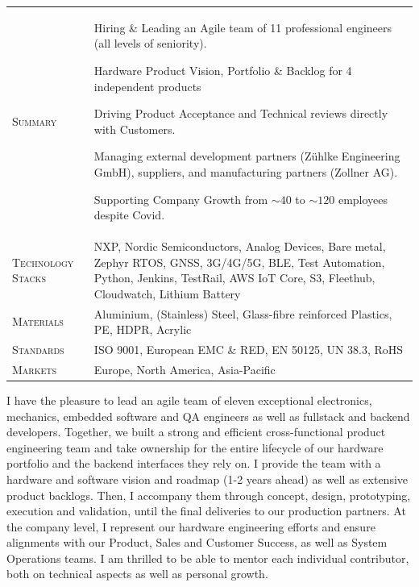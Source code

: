 \documentclass[10pt,a4paper]{moderncv}
\begin{document}
    \begin{tabularx}{\textwidth}{>{\scshape}l@{\hskip 3.5mm}L}
        Summary & Hiring \& Leading an Agile team of 11 professional engineers (all levels of seniority).
        \par Hardware Product Vision, Portfolio \& Backlog for 4 independent products
        \par Driving Product Acceptance and Technical reviews directly with Customers.
        \par Managing external development partners (Zühlke Engineering GmbH), suppliers, and manufacturing partners (Zollner AG).
        \par Supporting Company Growth from $\sim 40$ to $\sim 120$ employees despite Covid.\\
        Technology Stacks & NXP, Nordic Semiconductors, Analog Devices, Bare metal, Zephyr RTOS, GNSS, 3G/4G/5G, BLE, Test Automation, Python, Jenkins, TestRail, AWS IoT Core, S3, Fleethub, Cloudwatch, Lithium Battery\\
        Materials &  Aluminium, (Stainless) Steel, Glass-fibre reinforced Plastics, PE, HDPR, Acrylic\\
        Standards & ISO 9001, European EMC \& RED, EN 50125, UN 38.3, RoHS\\
        Markets & Europe, North America, Asia-Pacific\\
    \end{tabularx}

    \vspace{1.5em}

    I have the pleasure to lead an agile team of eleven exceptional electronics, mechanics, embedded software and QA engineers as well as fullstack and backend developers. Together, we built a strong and efficient cross-functional product engineering team and take ownership for the entire lifecycle of our hardware portfolio and the backend interfaces they rely on. I provide the team with a hardware and software vision and roadmap (1-2 years ahead) as well as extensive product backlogs. Then, I accompany them through concept, design, prototyping, execution and validation, until the final deliveries to our production partners. At the company level, I represent our hardware engineering efforts and ensure alignments with our Product, Sales and Customer Success, as well as System Operations teams. I am thrilled to be able to mentor each individual contributor, both on technical aspects as well as personal growth.

\vspace{0.75em}
\end{document}
